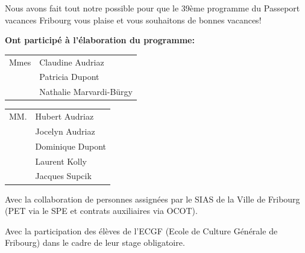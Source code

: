 \cleardoublepage
Nous avons fait tout notre possible pour que le 39ème programme du Passeport vacances Fribourg vous plaise et vous souhaitons de bonnes vacances!
	
\textbf{Ont participé à l'élaboration du programme:}

\begin{tabular}{p{1.6cm} l}
Mmes & Claudine Audriaz \\
& Patricia Dupont \\
& Nathalie Marvardi-Bürgy \\
\end{tabular}

\begin{tabular}{p{1.6cm} l}
	MM. & Hubert Audriaz \\
	& Jocelyn Audriaz \\
	& Dominique Dupont \\
	& Laurent Kolly \\
	& Jacques Supcik \\
\end{tabular}

Avec la collaboration de personnes assignées par le SIAS de la Ville de Fribourg (PET via le SPE et contrats auxiliaires via OCOT). 

Avec la participation des élèves de l'ECGF (Ecole de Culture Générale de Fribourg) dans le cadre de leur stage obligatoire.



